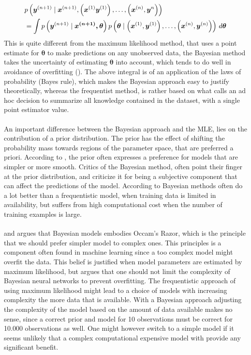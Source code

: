 \begin{equation} \label{eq:post_pred_distribution}
    \begin{split}
        &p\left(\boldsymbol{y}^{(n+1)} \mid \boldsymbol{x}^{(n+1)}, \left (\boldsymbol{x}^{(1)}\boldsymbol{y}^{(1)}\right), \ldots, \left (\boldsymbol{x}^{(n)}, \boldsymbol{y}^{n}\right)\right)\\
        &=\int p\left(\boldsymbol{y}^{(n+1)} \mid \boldsymbol{\boldsymbol{x}^{(n+1)}, \theta}\right) p \left (\boldsymbol{\theta} \mid \left (\boldsymbol{x}^{(1)}, \boldsymbol{y}^{(1)}\right), \ldots, \left (\boldsymbol{x}^{(n)}, \boldsymbol{y}^{(n)}\right)\right) \, d \boldsymbol{\theta}
    \end{split}
\end{equation}
This is quite different from the maximum likelihood method, that uses a point estimate for $\boldsymbol{\theta}$ to make predictions on any unobserved data, the Bayesian method takes the uncertainty of estimating $\boldsymbol{\theta}$ into account, which tends to do well in avoidance of overfitting (\cite{Goodfellow-et-al-2016}). The above integral is of an application of the laws of probability (Bayes rule), which makes the Bayesian approach easy to justify theoretically, whereas the frequentist method, is rather based on what \cite{Goodfellow-et-al-2016} calls an ad hoc decision to summarize all knowledge contained in the dataset, with a single point estimator value. 
\\
\\
An important difference between the Bayesian approach and the MLE, lies on the contribution of a prior distribution. The prior has the effect of shifting the probability mass towards regions of the parameter space, that are preferred a priori. According to \cite{Goodfellow-et-al-2016}, the prior often expresses a preference for models that are simpler or more smooth. Critics of the Bayesian method, often point their finger at the prior distribution, and criticize it for being a subjective component that can affect the predictions of the model. According to \cite{neal2012bayesian} Bayesian methods often do a lot better than a frequentistic model, when training data is limited in availability, but suffers from high computational cost when the number of training examples is large. 
\\
\\
\cite{neal2012bayesian} and \cite{mackay1991} argues that Bayesian models embodies Occam's Razor, which is the principle that we should prefer simpler model to complex ones. This principles is a component often found in machine learning since a too complex model might overfit the data. This belief is justified when model parameters are estimated by maximum likelihood, but \cite{neal2012bayesian} argues that one should not limit the complexity of Bayesian neural networks to prevent overfitting. The frequentistic approach of using maximum likelihood might lead to a choice of models with increasing complexity the more data that is available. With a Bayesian approach adjusting the complexity of the model based on the amount of data available makes no sense, since a correct prior and model for 10 observations must be correct for 10.000 observations as well. One might however switch to a simple model if it seems unlikely that a complex computational expensive model with provide any significant benefit. 
